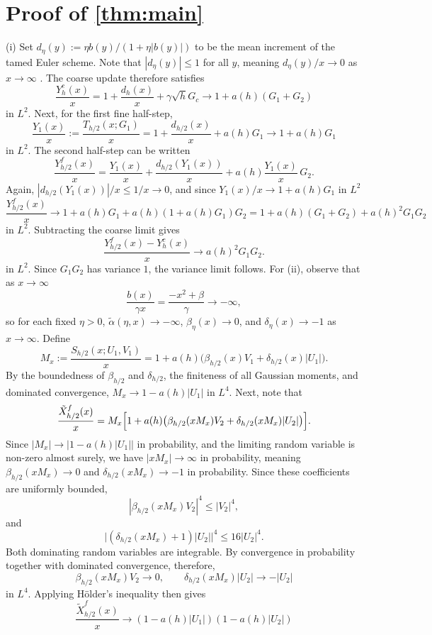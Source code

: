 \documentclass[11pt]{article}
\begin{document}
\section{Proof of \cref{thm:main}} \label{sec:pf_var_cpl}
(i) Set $d_\eta(y) := \eta b(y)/(1+\eta |b(y)|)$ to be the mean increment of the tamed Euler scheme.  Note that $|d_\eta(y)| \le 1$ for all $y$, meaning $d_\eta(y)/x \to 0$ as $x \to \infty$ .  The coarse update therefore satisfies
\[
\frac{Y_h^c(x)}{x}
=
1 + \frac{d_h(x)}{x} + \gamma \sqrt{h}G_c \rightarrow
1 + a(h)(G_1 + G_2)
\]
in $L^2$.  Next, for the first fine half-step,
\[
\frac{Y_1(x)}{x}
:=
\frac{T_{h/2}(x;G_1)}{x}
=
1 + \frac{d_{h/2}(x)}{x} + a(h) G_1
\rightarrow
1 + a(h) G_1
\]
in $L^2$.  The second half-step can be written
\[
\frac{Y_{h/2}^f(x)}{x}
=
\frac{Y_1(x)}{x}
+
\frac{d_{h/2}(Y_1(x))}{x}
+
a(h)\frac{Y_1(x)}{x}\,G_2.
\]
Again, $|d_{h/2}(Y_1(x))|/x \le 1/x \to 0$, and since $Y_1(x)/x \to 1+a(h)G_1$ in $L^2$
\[
\frac{Y_{h/2}^f(x)}{x}
\rightarrow
1 + a(h) G_1 + a(h)(1 + a(h) G_1) G_2
=
1 + a(h)(G_1 + G_2) + a(h)^2 G_1 G_2
\]
in $L^2$.  Subtracting the coarse limit gives
\[
\frac{Y_{h/2}^f(x) - Y_h^c(x)}{x}
\rightarrow
a(h)^2 G_1 G_2.
\]
in $L^2$.  Since $G_1G_2$ has variance $1$, the variance limit follows.  For (ii), observe that as $x \to\infty$
\[
\frac{b(x)}{\gamma x} = \frac{-x^2 + \beta}{\gamma} \to -\infty,
\]
so for each fixed $\eta>0$, $\tilde{\alpha}(\eta, x)\to -\infty$, $\beta_\eta(x)\to 0$, and $\delta_\eta(x)\to -1$ as $x \to \infty$.  Define
\[
M_x := \frac{S_{h/2}(x;U_1,V_1)}{x}
=
1 + a(h)\bigl(\beta_{h/2}(x)V_1 + \delta_{h/2}(x)|U_1|\bigr).
\]
By the boundedness of $\beta_{h/2}$ and $\delta_{h/2}$, the finiteness of all Gaussian moments, and dominated convergence,
$M_x \to 1-a(h)|U_1|$ in $L^4$.
Next, note that
\[
\frac{\tilde{X}_{h/2}^f(x)}{x}
=
M_x
\Bigl[
1 + a(h)\bigl(
\beta_{h/2}(xM_x)V_2
+
\delta_{h/2}(xM_x)|U_2|
\bigr)
\Bigr].
\]
Since $|M_x| \longrightarrow |1-a(h)|U_1||$ in probability, and the limiting random variable is non-zero almost surely, we have
$
|xM_x| \to \infty
$
in probability, meaning
$\beta_{h/2}(xM_x)\to 0$ and $\delta_{h/2}(xM_x)\to -1$
in probability. Since these coefficients are uniformly bounded,
\[
|\beta_{h/2}(xM_x)V_2|^4\le |V_2|^4,
\]
and
\[
\bigl|(\delta_{h/2}(xM_x)+1)|U_2|\bigr|^4
\le 16|U_2|^4.
\]
Both dominating random variables are integrable. By convergence in probability together with dominated convergence, therefore,
\[
\beta_{h/2}(xM_x)V_2\to0,
\qquad
\delta_{h/2}(xM_x)|U_2|\to-|U_2|
\]
in $L^4$. Applying H\"older's inequality then gives
\[
\frac{\tilde{X}_{h/2}^f(x)}{x}
\longrightarrow
(1-a(h)|U_1|)(1-a(h)|U_2|)
\]
\end{document}
